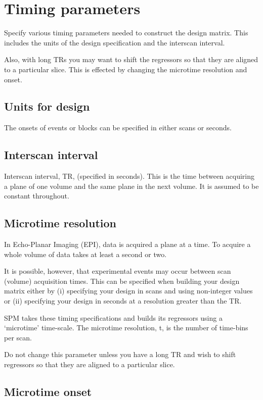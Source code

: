 \section{Timing parameters}

Specify various timing parameters needed to construct the design matrix. This includes the units of the design specification and the interscan interval.

Also, with long TRs you may want to shift the regressors so that they are aligned to a particular slice.  This is effected by changing the microtime resolution and onset.

\subsection{Units for design}

The onsets of events or blocks can be specified in either scans or seconds.

\subsection{Interscan interval}

Interscan interval, TR, (specified in seconds).  This is the time between acquiring a plane of one volume and the same plane in the next volume.  It is assumed to be constant throughout.

\subsection{Microtime resolution}

In Echo-Planar Imaging (EPI), data is acquired a plane at a time. To acquire a whole volume of data takes at least a second or two.

It is possible, however, that experimental events may occur between scan (volume) acquisition times. This can be specified when building your design matrix either by (i) specifying your design in scans and using non-integer values  or (ii) specifying your design in seconds at a resolution greater than the TR.

SPM takes these timing specifications and builds its regressors using a `microtime' time-scale. The microtime resolution, t, is the number of time-bins per scan.

Do not change this parameter unless you have a long TR and wish to shift regressors so that they are aligned to a particular slice.

\subsection{Microtime onset}

